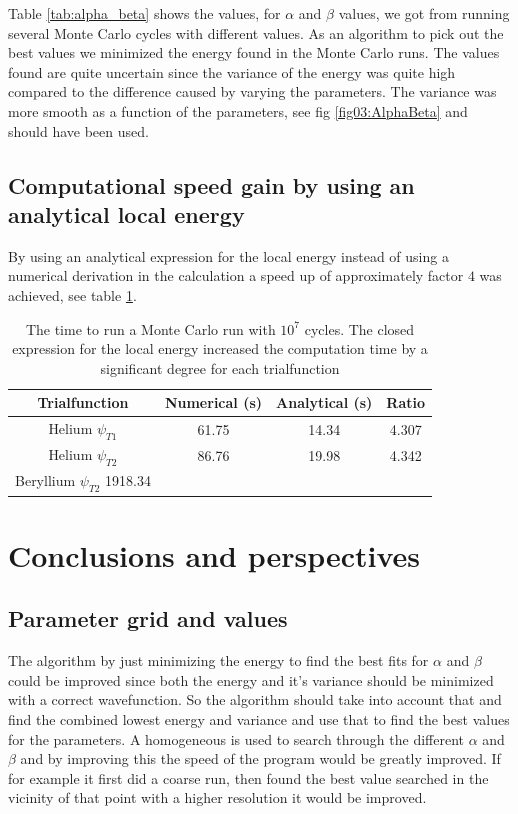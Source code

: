 \documentclass[11pt]{article}
\begin{document}
	Table \ref{tab:alpha_beta} shows the values, for \(\alpha\) and \(\beta\) values, we got from  running several Monte Carlo cycles with different values. As an algorithm to pick out the best values we minimized the energy found in the Monte Carlo runs. The values found are quite uncertain since the variance of the energy was quite high compared to the difference caused by varying the parameters. The variance was more smooth as a function of the parameters, see fig \ref{fig03:AlphaBeta} and should have been used.


	\subsection{Computational speed gain by using an analytical local energy}
	By using an analytical expression for the local energy instead of using a numerical derivation in the calculation a speed up of approximately factor \(4\) was achieved, see table \ref{tab:analyticVSNumeric}. 


	\begin{table}
\center
		\begin{tabular}{| c | c | c | c |}
		    \hline
		   	\textbf{Trialfunction} & Numerical (s) & Analytical (s) & Ratio
		    \\ \hline
		    Helium $\psi_{T1}$ & 61.75 & 14.34 & 4.307
		    \\ \hline 
		    Helium $\psi_{T2}$ & 86.76 & 19.98	& 4.342
		    \\	\hline 
		    Beryllium $\psi_{T2}$ 1918.34 	& &	 &
 		    \\ \hline
	  \end{tabular}
	  \caption{The time to run a Monte Carlo run with \(10^7\) cycles. The closed expression for the local energy increased the computation time by a significant degree for each trialfunction }
	  \label{tab:analyticVSNumeric}
\end{table}

\section{Conclusions and perspectives}

	\subsection{Parameter grid  and values }
		The algorithm by just minimizing the energy to find the best fits for \(\alpha\) and \(\beta\) could be improved since both the energy and it's variance should be minimized with a correct wavefunction. So the algorithm should take into account that and find the combined lowest energy and variance and use that to find the best values for the parameters. A homogeneous is used to search through the different \(\alpha\) and \(\beta\) and by improving this the speed of the program would be greatly improved. If for example it first did a coarse run, then found the best value searched in the vicinity of that point with a higher resolution it would be improved.
\end{document}
